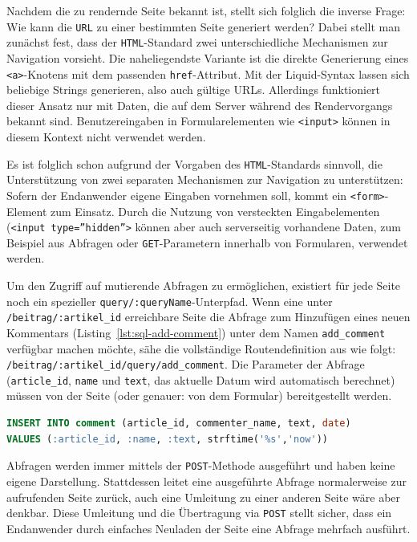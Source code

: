 Nachdem die zu rendernde Seite bekannt ist, stellt sich folglich die inverse Frage: Wie kann die \texttt{URL} zu einer bestimmten Seite generiert werden? Dabei stellt man zunächst fest, dass der \texttt{HTML}-Standard zwei unterschiedliche Mechanismen zur Navigation vorsieht. Die naheliegendste Variante ist die direkte Generierung eines \texttt{<a>}-Knotens mit dem passenden \texttt{href}-Attribut. Mit der Liquid-Syntax lassen sich beliebige Strings generieren, also auch gültige URLs. Allerdings funktioniert dieser Ansatz nur mit Daten, die auf dem Server während des Rendervorgangs bekannt sind. Benutzereingaben in Formularelementen wie \texttt{<input>} können in diesem Kontext nicht verwendet werden.

Es ist folglich schon aufgrund der Vorgaben des \texttt{HTML}-Standards sinnvoll, die Unterstützung von zwei separaten Mechanismen zur Navigation zu unterstützen: Sofern der Endanwender eigene Eingaben vornehmen soll, kommt ein \texttt{<form>}-Element zum Einsatz. Durch die Nutzung von versteckten Eingabelementen (\texttt{<input type=''hidden''>} können aber auch serverseitig vorhandene Daten, zum Beispiel aus Abfragen oder \texttt{GET}-Parametern innerhalb von Formularen, verwendet werden.

Um den Zugriff auf mutierende Abfragen zu ermöglichen, existiert für jede Seite noch ein spezieller \texttt{query/:queryName}-Unterpfad. Wenn eine unter \texttt{/beitrag/:artikel\_id} erreichbare Seite die Abfrage zum Hinzufügen eines neuen Kommentars (Listing~\ref{lst:sql-add-comment}) unter dem Namen \texttt{add\_comment} verfügbar machen möchte, sähe die vollständige Routendefinition aus wie folgt: \texttt{/beitrag/:artikel\_id/query/add\_comment}. Die Parameter der Abfrage (\texttt{article\_id}, \texttt{name} und \texttt{text}, das aktuelle Datum wird automatisch berechnet) müssen von der Seite (oder genauer: von dem Formular) bereitgestellt werden.

\begin{lstlisting}[float=h!, language=SQL, caption={Abfrage zum Hinzufügen eines neuen Kommentars}, label={lst:sql-add-comment}]
INSERT INTO comment (article_id, commenter_name, text, date)
VALUES (:article_id, :name, :text, strftime('%s','now'))
\end{lstlisting}

Abfragen werden immer mittels der \texttt{POST}-Methode ausgeführt und haben keine eigene Darstellung. Stattdessen leitet eine ausgeführte Abfrage normalerweise zur aufrufenden Seite zurück, auch eine Umleitung zu einer anderen Seite wäre aber denkbar. Diese Umleitung und die Übertragung via \texttt{POST} stellt sicher, dass ein Endanwender durch einfaches Neuladen der Seite eine Abfrage mehrfach ausführt.

